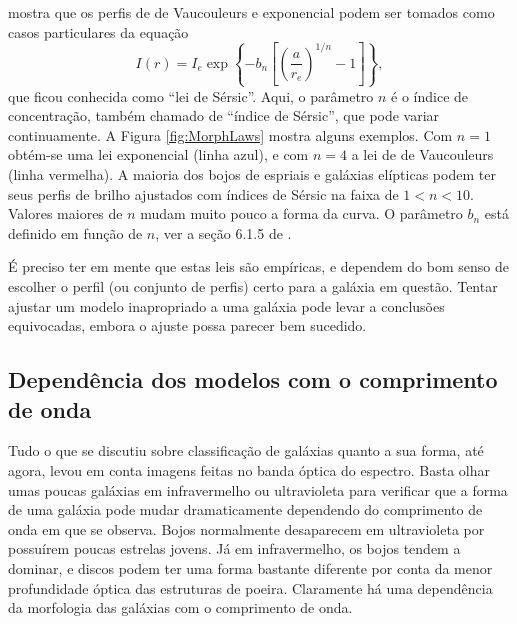 \citet{Sersic1963} mostra que os perfis de de Vaucouleurs e exponencial podem
ser tomados como casos particulares da equação
\begin{equation*}
I(r) = I_e \exp \left\{- b_n \left[ \left( \frac{a}{r_e} \right)^{1/n}
- 1 \right] \right\},
\end{equation*}
que ficou conhecida como ``lei de Sérsic''. Aqui, o parâmetro $n$ é o índice de
concentração, também chamado de ``índice de Sérsic'', que pode variar
continuamente. A Figura \ref{fig:MorphLaws} mostra alguns exemplos. Com
$n\!=\!1$ obtém-se uma lei exponencial (linha azul), e com $n\!=\!4$ a lei de de
Vaucouleurs (linha vermelha). A maioria dos bojos de espriais e galáxias
elípticas podem ter seus perfis de brilho ajustados com índices de Sérsic na
faixa de $1 < n < 10$. Valores maiores de $n$ mudam muito pouco a forma da
curva. O parâmetro $b_n$ está definido em função de $n$, ver a seção 6.1.5 de
\citet{Erwin2015}.

É preciso ter em mente que estas leis são empíricas, e dependem do bom senso de
escolher o perfil (ou conjunto de perfis) certo para a galáxia em questão.
Tentar ajustar um modelo inapropriado a uma galáxia pode levar a conclusões
equivocadas, embora o ajuste possa parecer bem sucedido.


\subsection{Dependência dos modelos com o comprimento de onda}
\label{sec:morph:comp:depLambda}

Tudo o que se discutiu sobre classificação de galáxias quanto a sua forma, até
agora, levou em conta imagens feitas no banda óptica do espectro. Basta olhar
umas poucas galáxias em infravermelho ou ultravioleta para verificar que a forma
de uma galáxia pode mudar dramaticamente dependendo do comprimento de onda em
que se observa. Bojos normalmente desaparecem em ultravioleta por possuírem
poucas estrelas jovens. Já em infravermelho, os bojos tendem a dominar, e discos
podem ter uma forma bastante diferente por conta da menor profundidade óptica
das estruturas de poeira. Claramente há uma dependência da morfologia das
galáxias com o comprimento de onda.

